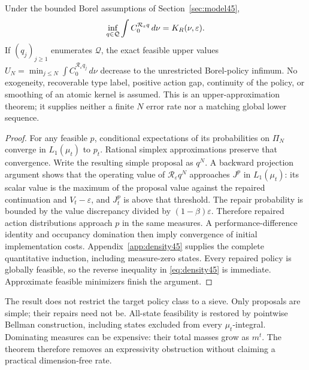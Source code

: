 \begin{theorem}\label{thm:density45}
Under the bounded Borel assumptions of Section~\ref{sec:model45},
\begin{equation}\label{eq:density45}
 \inf_{q\in\mathcal Q}\int C_0^{\mathcal R_\varepsilon q}\,d\nu
       =K_R(\nu,\varepsilon).
\end{equation}
If $(q_j)_{j\ge1}$ enumerates $\mathcal Q$, the exact feasible upper values
$U_N=\min_{j\le N}\int C_0^{\mathcal R_\varepsilon q_j}\,d\nu$ decrease to the unrestricted Borel-policy infimum. No exogeneity, recoverable type label, positive action gap, continuity of the policy, or smoothing of an atomic kernel is assumed. This is an upper-approximation theorem; it supplies neither a finite $N$ error rate nor a matching global lower sequence.
\end{theorem}
\begin{proof}
For any feasible $p$, conditional expectations of its probabilities on $\Pi_N$ converge in $L_1(\mu_t)$ to $p_t$. Rational simplex approximations preserve that convergence. Write the resulting simple proposal as $q^N$. A backward projection argument shows that the operating value of $\mathcal R_\varepsilon q^N$ approaches $J^p$ in $L_1(\mu_t)$: its scalar value is the maximum of the proposal value against the repaired continuation and $V_t-\varepsilon$, and $J_t^p$ is above that threshold. The repair probability is bounded by the value discrepancy divided by $(1-\beta)\varepsilon$. Therefore repaired action distributions approach $p$ in the same measures. A performance-difference identity and occupancy domination then imply convergence of initial implementation costs. Appendix~\ref{app:density45} supplies the complete quantitative induction, including measure-zero states. Every repaired policy is globally feasible, so the reverse inequality in \eqref{eq:density45} is immediate. Approximate feasible minimizers finish the argument.
\end{proof}
The result does not restrict the target policy class to a sieve. Only proposals are simple; their repairs need not be. All-state feasibility is restored by pointwise Bellman construction, including states excluded from every $\mu_t$-integral. Dominating measures can be expensive: their total masses grow as $m^t$. The theorem therefore removes an expressivity obstruction without claiming a practical dimension-free rate.

